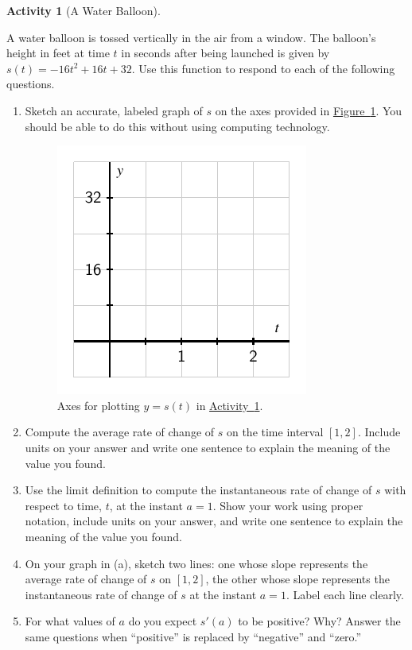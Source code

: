 \documentclass[10pt,]{book}
\theoremstyle{plain}
\theoremstyle{definition}
\theoremstyle{definition}
\theoremstyle{definition}
\theoremstyle{definition}
\newtheorem{activity}[project]{Activity}
\theoremstyle{definition}
\numberwithin{equation}{section}
\begin{document}
\begin{activity}[A Water Balloon]\label{act-1-3-2}

        A water balloon is tossed vertically in the air from a window. The balloon's height in feet at time \(t\) in seconds after being launched is given by \(s(t) = -16t^2 + 16t + 32\). Use this function to respond to each of the following questions.
\leavevmode%
\begin{enumerate}[label=\alph*]
\item\hypertarget{li-140}{}Sketch an accurate, labeled graph of \(s\) on the axes provided in \hyperref[F-1-3-Act2]{Figure~\ref{F-1-3-Act2}}.  You should be able to do this without using computing technology.
            \leavevmode%
\begin{figure}
\centering
\includegraphics[width=0.5\linewidth]{images/1_3_Act2}
\caption{Axes for plotting \(y = s(t)\) in \hyperref[act-1-3-2]{Activity~\ref{act-1-3-2}}.\label{F-1-3-Act2}}
\end{figure}
%
\item\hypertarget{li-141}{}Compute the average rate of change of \(s\) on the time interval \([1,2]\).  Include units on your answer and write one sentence to explain the meaning of the value you found.%
\item\hypertarget{li-142}{}Use the limit definition to compute the instantaneous rate of change of \(s\) with respect to time, \(t\), at the instant \(a = 1\).  Show your work using proper notation, include units on your answer, and write one sentence to explain the meaning of the value you found.%
\item\hypertarget{li-143}{}On your graph in (a), sketch two lines:  one whose slope represents the average rate of change of \(s\) on \([1,2]\), the other whose slope represents the instantaneous rate of change of \(s\) at the instant \(a=1\).  Label each line clearly.%
\item\hypertarget{li-144}{}For what values of \(a\) do you expect \(s'(a)\) to be positive?  Why?  Answer the same questions when ``positive'' is replaced by ``negative'' and  ``zero.''%

\end{enumerate}
\end{activity}
\end{document}
